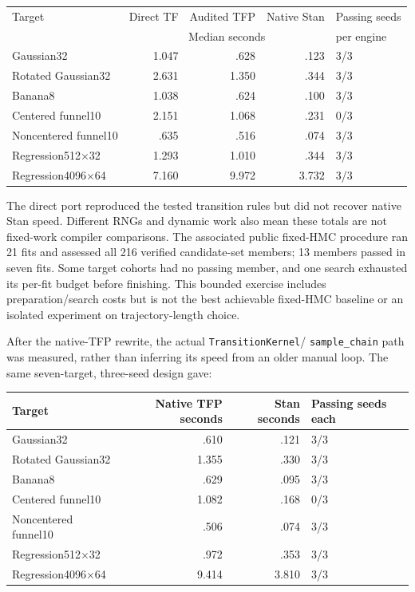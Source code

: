 \begin{center}\small
\begin{tabular}{lrrrl}
\toprule
Target & Direct TF & Audited TFP & Native Stan & Passing seeds\\
 & \multicolumn{3}{c}{Median seconds} & per engine\\
\midrule
Gaussian32 & 1.047 & .628 & .123 & 3/3\\
Rotated Gaussian32 & 2.631 & 1.350 & .344 & 3/3\\
Banana8 & 1.038 & .624 & .100 & 3/3\\
Centered funnel10 & 2.151 & 1.068 & .231 & 0/3\\
Noncentered funnel10 & .635 & .516 & .074 & 3/3\\
Regression512$\times$32 & 1.293 & 1.010 & .344 & 3/3\\
Regression4096$\times$64 & 7.160 & 9.972 & 3.732 & 3/3\\
\bottomrule
\end{tabular}
\end{center}

The direct port reproduced the tested transition rules but did not recover
native Stan speed. Different RNGs and dynamic work also mean these totals
are not fixed-work compiler comparisons. The associated public fixed-HMC
procedure ran 21 fits and assessed all 216 verified candidate-set members;
13 members passed in seven fits. Some target cohorts had no passing member,
and one search exhausted its per-fit budget before finishing. This bounded
exercise includes preparation/search costs but is not the best achievable
fixed-HMC baseline or an isolated experiment on trajectory-length choice.

After the native-TFP rewrite, the actual \texttt{TransitionKernel}/
\texttt{sample\_chain} path was measured, rather than inferring its speed
from an older manual loop. The same seven-target, three-seed design gave:

\begin{center}\small
\begin{tabular}{lrrl}
\toprule
Target & Native TFP seconds & Stan seconds & Passing seeds each\\
\midrule
Gaussian32 & .610 & .121 & 3/3\\
Rotated Gaussian32 & 1.355 & .330 & 3/3\\
Banana8 & .629 & .095 & 3/3\\
Centered funnel10 & 1.082 & .168 & 0/3\\
Noncentered funnel10 & .506 & .074 & 3/3\\
Regression512$\times$32 & .972 & .353 & 3/3\\
Regression4096$\times$64 & 9.414 & 3.810 & 3/3\\
\bottomrule
\end{tabular}
\end{center}

